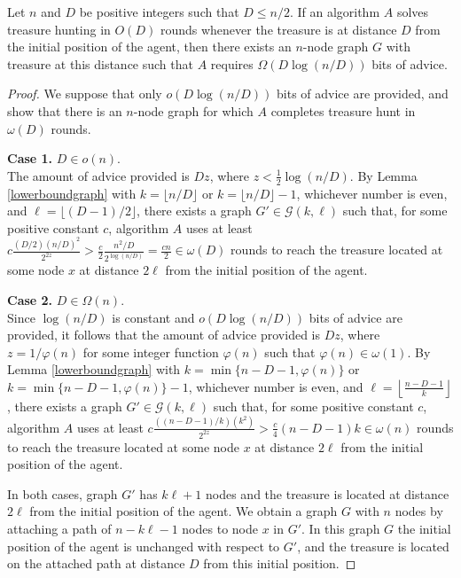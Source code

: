 \documentclass{llncs}
\newcommand{\classletter}{\ensuremath{\mathcal{G}}}
\newcommand{\ourclass}{\ensuremath{\classletter (k,\ell)}}
\begin{document}
\begin{theorem}\label{lb1}
Let $n$ and $D$ be positive integers such that $D\leq n/2$.
 If an algorithm  $A$ solves treasure hunting in $O(D)$ rounds whenever the treasure is at distance $D$ from the initial position of the agent, 
 then there exists an $n$-node graph $G$ with treasure at this distance such that $A$ requires $\Omega(D\log(n/D))$ bits of advice.
\end{theorem}
\begin{proof}
We suppose that only $o(D\log(n/D))$ bits of advice are provided, and show that there is an $n$-node graph for which $A$ completes treasure hunt in $\omega(D)$ rounds.

{\bf Case 1.} $D \in o(n)$.\\
The amount of advice provided is $Dz$, where $z < \frac{1}{2}\log(n/D)$. By Lemma \ref{lowerboundgraph} with $k =  \lfloor n/D \rfloor$ or $k= \lfloor n/D \rfloor-1$, whichever number is even, and $\ell = \lfloor (D-1)/2 \rfloor$, there exists a graph $G' \in \ourclass$ such that, for some positive constant $c$, algorithm $A$ uses at least $c\frac{(D/2)(n/D)^2}{2^{2z}} > \frac{c}{2}\frac{n^2/D}{2^{\log(n/D)}} = \frac{cn}{2} \in \omega(D)$ rounds to reach the treasure located at some node $x$ at distance $2\ell$
from the initial position of the agent. 

{\bf Case 2.} $D \in \Omega(n)$.\\
Since $\log (n/D)$ is constant and $o(D\log(n/D))$ bits of advice are provided, it follows that
the amount of advice provided is $Dz$, where $z = 1/\varphi(n)$ for some integer function $\varphi(n)$ such that $\varphi(n) \in \omega(1)$. By Lemma \ref{lowerboundgraph} with $k = \min \{n-D-1, \varphi(n) \}$ or $k=\min \{n-D-1, \varphi(n) \}-1$, whichever number is even, and $\ell = \left\lfloor \frac{n-D-1}{k} \right\rfloor$, there exists a graph $G' \in \ourclass$ such that, for some positive constant $c$, algorithm $A$ uses at least $c\frac{((n-D-1)/k)(k^2)}{2^{2z}} > \frac{c}{4}(n-D-1)k \in \omega(n)$ rounds to reach the treasure located at some node $x$ at distance $2\ell$
from the initial position of the agent. 


In both cases, graph $G'$ has $k\ell + 1$ nodes and the treasure is located at distance $2\ell$ from the initial position of the agent.
We obtain a graph $G$ with $n$ nodes by attaching a path of $n-k\ell-1$ nodes  to node $x$ in $G'$. In this graph $G$ the initial position of the agent is unchanged
with respect to $G'$, and 
the treasure is located on the attached path at distance $D$ from this initial position. 
\end{proof}
\end{document}
